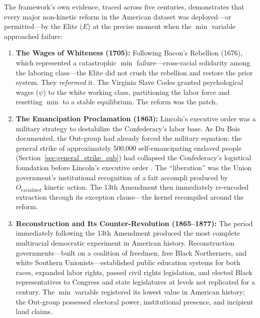 The framework's own evidence, traced across five centuries, demonstrates that every major non-kinetic reform in the American dataset was deployed---or permitted---by the Elite ($E$) at the precise moment when the $\min$ variable approached failure:

\begin{enumerate}
    \item \textbf{The Wages of Whiteness (1705):} Following Bacon's Rebellion (1676), which represented a catastrophic $\min$ failure---cross-racial solidarity among the laboring class---the Elite did not crush the rebellion and restore the prior system. They \textit{reformed} it. The Virginia Slave Codes granted psychological wages ($\psi$) to the white working class, partitioning the labor force and resetting $\min$ to a stable equilibrium. The reform was the patch.

    \item \textbf{The Emancipation Proclamation (1863):} Lincoln's executive order was a military strategy to destabilize the Confederacy's labor base. As Du Bois documented, the Out-group had already forced the military equation: the general strike of approximately 500,000 self-emancipating enslaved people (Section~\ref{sec:general_strike_sub}) had collapsed the Confederacy's logistical foundation before Lincoln's executive order \cite{dubois}. The ``liberation'' was the Union government's institutional recognition of a fait accompli produced by $O_{\text{racialized}}$ kinetic action. The 13th Amendment then immediately re-encoded extraction through its exception clause---the kernel recompiled around the reform.

    \item \textbf{Reconstruction and Its Counter-Revolution (1865--1877):} The period immediately following the 13th Amendment produced the most complete multiracial democratic experiment in American history. Reconstruction governments---built on a coalition of freedmen, free Black Northerners, and white Southern Unionists---established public education systems for both races, expanded labor rights, passed civil rights legislation, and elected Black representatives to Congress and state legislatures at levels not replicated for a century. The $\min$ variable registered its lowest value in American history; the Out-group possessed electoral power, institutional presence, and incipient land claims.


\end{enumerate}
